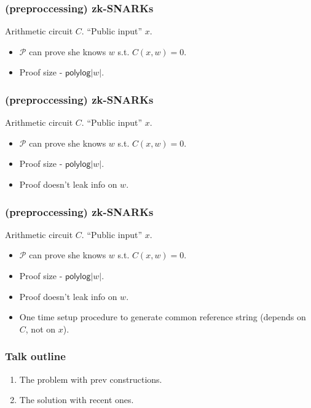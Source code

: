 \documentclass[shadesubsections,trans,14pt,mathserif]{beamer}
\newcommand{\prv}{\ensuremath{\mathcal{P}}}
\begin{document}
\begin{frame}
\frametitle{(preproccessing) zk-SNARKs}   %
Arithmetic circuit $C$. ``Public input'' $x$.
  \begin{itemize}
  \item $\prv$ can prove she knows $w$ s.t. $C(x,w)=0$.
   \item Proof size - $\mathsf{polylog}|w|$.
  \end{itemize}
\end{frame}
\begin{frame}
\frametitle{(preproccessing) zk-SNARKs}   %
Arithmetic circuit $C$. ``Public input'' $x$.
  \begin{itemize}
  \item $\prv$ can prove she knows $w$ s.t. $C(x,w)=0$.
   \item Proof size - $\mathsf{polylog}|w|$.
\item Proof doesn't leak info on $w$.
  \end{itemize}
\end{frame}
\begin{frame}
\frametitle{(preproccessing) zk-SNARKs}   %
Arithmetic circuit $C$. ``Public input'' $x$.
  \begin{itemize}
  \item $\prv$ can prove she knows $w$ s.t. $C(x,w)=0$.
   \item Proof size - $\mathsf{polylog}|w|$.
\item Proof doesn't leak info on $w$.
  \item One time setup procedure to generate common reference string (depends on $C$, not on $x$).
  \end{itemize}
\end{frame}

\begin{frame}
\frametitle{Talk outline}   %
 
  \begin{enumerate}
\item The problem with prev constructions.
 \item The solution with recent ones.
\end{enumerate}

\end{frame}
\end{document}
